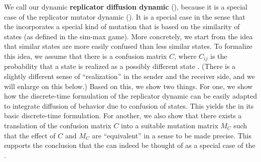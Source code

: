 We call our dynamic \textbf{replicator diffusion dynamic} (\rdd),
because it is a special case of the replicator mutator dynamic
(\rmd). It is a special case in the sense that the \rdd incorporates a
special kind of mutation that is based on the similarity of states (as
defined in the sim-max game). More concretely, we start from the idea
that similar states are more easily confused than less similar
states. To formalize this idea, we assume that there is a confusion
matrix $C$, where $C_{ij}$ is the probability that a state 
is realized as a possibly different state . (There is a
slightly different sense of ``realization'' in the sender and the
receiver side, and we will enlarge on this below.) Based on this, we
show two things. For one, we show how the discrete-time formulation of
the replicator dynamic can be easily adapted to integrate diffusion of
behavior due to confusion of states. This yields the \rdd in its basic
discrete-time formulation. For another, we also show that there exists
a translation of the confusion matrix $C$ into a suitable mutation
matrix $M_C$ such that the effect of $C$ and $M_C$ are ``equivalent''
in a sense to be made precise. This supports the conclusion that the
\rdd can indeed be thought of as a special case of the \rmd.






